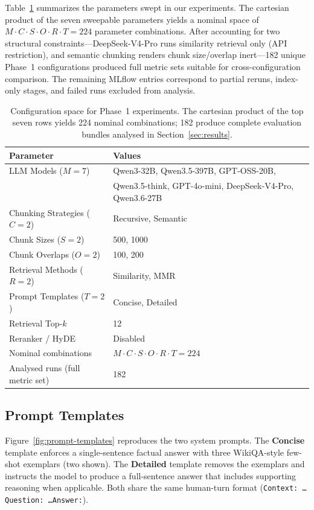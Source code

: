 Table~\ref{tab:config-space} summarizes the parameters swept in our experiments. The cartesian product of the seven sweepable parameters yields a nominal space of $M \cdot C \cdot S \cdot O \cdot R \cdot T = 224$ parameter combinations. After accounting for two structural constraints---DeepSeek-V4-Pro runs similarity retrieval only (API restriction), and semantic chunking renders chunk size/overlap inert---182 unique Phase~1 configurations produced full metric sets suitable for cross-configuration comparison. The remaining MLflow entries correspond to partial reruns, index-only stages, and failed runs excluded from analysis.

\begin{table}[t]
\centering
\caption{Configuration space for Phase~1 experiments. The cartesian product of the top seven rows yields 224 nominal combinations; 182 produce complete evaluation bundles analysed in Section~\ref{sec:results}.}
\label{tab:config-space}
\begin{tabular}{ll}
\toprule
\textbf{Parameter} & \textbf{Values} \\
\midrule
LLM Models ($M=7$) & Qwen3-32B, Qwen3.5-397B, GPT-OSS-20B, \\
           & Qwen3.5-think, GPT-4o-mini, DeepSeek-V4-Pro, Qwen3.6-27B \\
Chunking Strategies ($C=2$) & Recursive, Semantic \\
Chunk Sizes ($S=2$) & 500, 1000 \\
Chunk Overlaps ($O=2$) & 100, 200 \\
Retrieval Methods ($R=2$) & Similarity, MMR \\
Prompt Templates ($T=2$) & Concise, Detailed \\
Retrieval Top-$k$ & 12 \\
Reranker / HyDE & Disabled \\
\midrule
Nominal combinations & $M \cdot C \cdot S \cdot O \cdot R \cdot T = 224$ \\
Analysed runs (full metric set) & 182 \\
\bottomrule
\end{tabular}
\end{table}

\subsection{Prompt Templates}

Figure~\ref{fig:prompt-templates} reproduces the two system prompts. The \textbf{Concise} template enforces a single-sentence factual answer with three WikiQA-style few-shot exemplars (two shown). The \textbf{Detailed} template removes the exemplars and instructs the model to produce a full-sentence answer that includes supporting reasoning when applicable. Both share the same human-turn format (\texttt{Context:\,\ldots Question:\,\ldots Answer:}).

